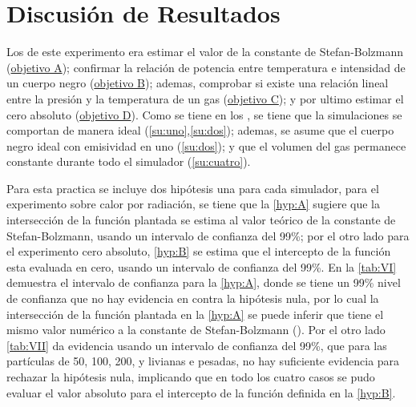 \documentclass[12pt,a4paper]{config/myConfig}
\begin{document}
\section{Discusión de Resultados}
\label{sec:DISCUSSION}
    
\indent Los de este experimento era estimar el valor de la constante de Stefan-Bolzmann (\hyperref[obj:A]{objetivo A}); confirmar la relación de potencia entre temperatura e intensidad de un cuerpo negro (\hyperref[obj:B]{objetivo B}); ademas, comprobar si existe una relación lineal entre la presión y la temperatura de un gas (\hyperref[obj:C]{objetivo C}); y por ultimo estimar el cero absoluto (\hyperref[obj:D]{objetivo D}). Como se tiene en los , se tiene que la simulaciones se comportan de manera ideal (\cref{su:uno},\cref{su:dos}); ademas, se asume que el cuerpo negro ideal con emisividad en uno (\cref{su:dos}); y que el volumen del gas permanece constante durante todo el simulador (\cref{su:cuatro}).\newline 

\indent Para esta practica se incluye dos hipótesis una para cada simulador, para el experimento sobre calor por radiación, se tiene que la \cref{hyp:A} sugiere que la intersección de la función plantada se estima al valor teórico de la constante de Stefan-Bolzmann, usando un intervalo de confianza del 99\%; por el otro lado para el experimento cero absoluto, \cref{hyp:B} se estima que el intercepto de la función esta evaluada en cero, usando un intervalo de confianza del 99\%. En la \cref{tab:VI} demuestra el intervalo de confianza para la \cref{hyp:A}, donde se tiene un 99\% nivel de confianza que no hay evidencia en contra la hipótesis nula, por lo cual la intersección de la función plantada en la \cref{hyp:A} se puede inferir que tiene el mismo valor numérico a la constante de Stefan-Bolzmann (\cite{physicsTextbook}). Por el otro lado \cref{tab:VII} da evidencia usando un intervalo de confianza del 99\%, que para las partículas de 50, 100, 200, y livianas e pesadas, no hay suficiente evidencia para rechazar la hipótesis nula, implicando que en todo los cuatro casos se pudo evaluar el valor absoluto para el intercepto de la función definida en la \cref{hyp:B}.\newline
\end{document}
